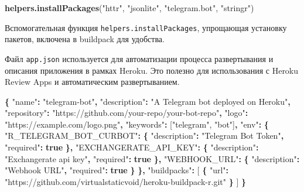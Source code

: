\documentclass[
]{book}
\newenvironment{Shaded}{\begin{snugshade}}{\end{snugshade}}
\newcommand{\DataTypeTok}[1]{\textcolor[rgb]{0.13,0.29,0.53}{#1}}
\newcommand{\FunctionTok}[1]{\textcolor[rgb]{0.13,0.29,0.53}{\textbf{#1}}}
\newcommand{\KeywordTok}[1]{\textcolor[rgb]{0.13,0.29,0.53}{\textbf{#1}}}
\newcommand{\NormalTok}[1]{#1}
\newcommand{\OtherTok}[1]{\textcolor[rgb]{0.56,0.35,0.01}{#1}}
\newcommand{\StringTok}[1]{\textcolor[rgb]{0.31,0.60,0.02}{#1}}
\begin{document}
\begin{Shaded}
\begin{Highlighting}[]
\FunctionTok{helpers.installPackages}\NormalTok{(}\StringTok{"httr"}\NormalTok{, }\StringTok{"jsonlite"}\NormalTok{, }\StringTok{"telegram.bot"}\NormalTok{, }\StringTok{"stringr"}\NormalTok{)}
\end{Highlighting}
\end{Shaded}

Вспомогательная функция \texttt{helpers.installPackages}, упрощающая установку пакетов, включена в buildpack для удобства.

Файл \texttt{app.json} используется для автоматизации процесса развертывания и описания приложения в рамках Heroku. Это полезно для использования с Heroku Review Apps и автоматическим развертыванием.

\begin{Shaded}
\begin{Highlighting}[]
\FunctionTok{\{}
  \DataTypeTok{"name"}\FunctionTok{:} \StringTok{"telegram{-}bot"}\FunctionTok{,}
  \DataTypeTok{"description"}\FunctionTok{:} \StringTok{"A Telegram bot deployed on Heroku"}\FunctionTok{,}
  \DataTypeTok{"repository"}\FunctionTok{:} \StringTok{"https://github.com/your{-}repo/your{-}bot{-}repo"}\FunctionTok{,}
  \DataTypeTok{"logo"}\FunctionTok{:} \StringTok{"https://example.com/logo.png"}\FunctionTok{,}
  \DataTypeTok{"keywords"}\FunctionTok{:} \OtherTok{[}\StringTok{"telegram"}\OtherTok{,} \StringTok{"bot"}\OtherTok{]}\FunctionTok{,}
  \DataTypeTok{"env"}\FunctionTok{:} \FunctionTok{\{}
    \DataTypeTok{"R\_TELEGRAM\_BOT\_CURBOT"}\FunctionTok{:} \FunctionTok{\{}
      \DataTypeTok{"description"}\FunctionTok{:} \StringTok{"Telegram Bot Token"}\FunctionTok{,}
      \DataTypeTok{"required"}\FunctionTok{:} \KeywordTok{true}
    \FunctionTok{\},}
    \DataTypeTok{"EXCHANGERATE\_API\_KEY"}\FunctionTok{:} \FunctionTok{\{}
      \DataTypeTok{"description"}\FunctionTok{:} \StringTok{"Exchangerate api key"}\FunctionTok{,}
      \DataTypeTok{"required"}\FunctionTok{:} \KeywordTok{true}
    \FunctionTok{\},}
    \DataTypeTok{"WEBHOOK\_URL"}\FunctionTok{:} \FunctionTok{\{}
      \DataTypeTok{"description"}\FunctionTok{:} \StringTok{"Webhook URL"}\FunctionTok{,}
      \DataTypeTok{"required"}\FunctionTok{:} \KeywordTok{true}
    \FunctionTok{\}}
  \FunctionTok{\},}
  \DataTypeTok{"buildpacks"}\FunctionTok{:} \OtherTok{[}
    \FunctionTok{\{}
      \DataTypeTok{"url"}\FunctionTok{:} \StringTok{"https://github.com/virtualstaticvoid/heroku{-}buildpack{-}r.git"}
    \FunctionTok{\}}
  \OtherTok{]}
\FunctionTok{\}}
\end{Highlighting}
\end{Shaded}
\end{document}
